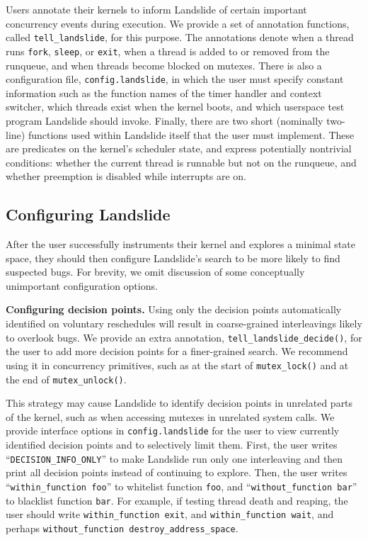 \documentclass{llncs}
\begin{document}
Users annotate their kernels to inform Landslide of certain important concurrency events during execution. We provide a set of annotation functions, called \texttt{tell\_landslide}, for this purpose. The annotations denote when a thread runs \texttt{fork}, \texttt{sleep}, or \texttt{exit}, when a thread is added to or removed from the runqueue, and when threads become blocked on mutexes.
There is also a configuration file, \texttt{config.landslide}, in which the user must specify constant information such as the function names of the timer handler and context switcher, which threads exist when the kernel boots, and which userspace test program Landslide should invoke.
Finally, there are two short (nominally two-line) functions used within Landslide itself that the user must implement. These are predicates on the kernel's scheduler state, and express potentially nontrivial conditions: whether the current thread is runnable but not on the runqueue, and whether preemption is disabled while interrupts are on.

\subsection{Configuring Landslide}
\label{sec:config}

After the user successfully instruments their kernel and explores a minimal state space, they should then configure Landslide's search to be more likely to find suspected bugs. For brevity, we omit discussion of some conceptually unimportant configuration options.

{\bf Configuring decision points.} Using only the decision points automatically identified on voluntary reschedules will result in coarse-grained interleavings likely to overlook bugs. We provide an extra annotation, \texttt{tell\_landslide\_decide()}, for the user to add more decision points for a finer-grained search. We recommend using it in concurrency primitives, such as at the start of \texttt{mutex\_lock()} and at the end of \texttt{mutex\_unlock()}. 

This strategy may cause Landslide to identify decision points in unrelated parts of the kernel, such as when accessing mutexes in unrelated system calls. We provide interface options in \texttt{config.landslide} for the user to view currently identified decision points and to selectively limit them. First, the user writes ``\texttt{DECISION\_INFO\_ONLY}'' to make Landslide run only one interleaving and then print all decision points instead of continuing to explore. Then, the user writes ``\texttt{within\_function foo}'' to whitelist function \texttt{foo}, and ``\texttt{without\_function bar}'' to blacklist function \texttt{bar}. For example, if testing thread death and reaping, the user should write \texttt{within\_function exit}, and \texttt{within\_function wait}, and perhaps \texttt{without\_function destroy\_address\_space}.
\end{document}
